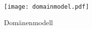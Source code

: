 \FloatBarrier
\begin{figure}[h]
    \centering
    \texttt{[image: domainmodel.pdf]}
    \caption{Domänenmodell}
\end{figure}
\FloatBarrier
